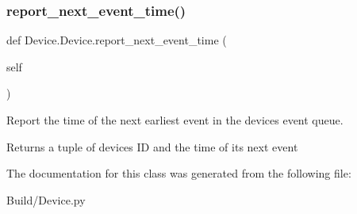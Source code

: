 \subsubsection{\texorpdfstring{report\+\_\+next\+\_\+event\+\_\+time()}{report\_next\_event\_time()}}
{\footnotesize\ttfamily def Device.\+Device.\+report\+\_\+next\+\_\+event\+\_\+time (\begin{DoxyParamCaption}\item[{}]{self }\end{DoxyParamCaption})}



Report the time of the next earliest event in the device\textquotesingle{}s event queue. 

\begin{DoxyReturn}{Returns}
a tuple of device\textquotesingle{}s ID and the time of its next event 
\end{DoxyReturn}


The documentation for this class was generated from the following file\+:\begin{DoxyCompactItemize}
\item 
Build/Device.\+py\end{DoxyCompactItemize}
